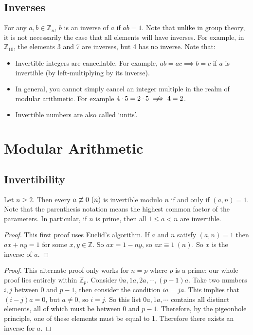 \documentclass{article}
\begin{document}
\subsection{Inverses}
For any $a, b \in \mathbb Z_n$, $b$ is an inverse of $a$ if $ab=1$. Note that unlike in group theory, it is not necessarily the case that all elements will have inverses. For example, in $\mathbb Z_{10}$, the elements 3 and 7 are inverses, but 4 has no inverse. Note that:
\begin{itemize}
	\item Invertible integers are cancellable. For example, $ab=ac \implies b=c$ if $a$ is invertible (by left-multiplying by its inverse).
	\item In general, you cannot simply cancel an integer multiple in the realm of modular arithmetic. For example $4 \cdot 5 = 2 \cdot 5 \centernot\implies 4 = 2$.
	\item Invertible numbers are also called `units'.
\end{itemize}

\section{Modular Arithmetic}
\subsection{Invertibility}
\begin{proposition}
	Let $n \geq 2$. Then every $a \centernot\equiv 0\ (n)$ is invertible modulo $n$ if and only if $(a, n) = 1$. Note that the parenthesis notation means the highest common factor of the parameters. In particular, if $n$ is prime, then all $1 \leq a < n$ are invertible.
\end{proposition}
\begin{proof}
	This first proof uses Euclid's algorithm. If $a$ and $n$ satisfy $(a, n) = 1$ then $ax + ny = 1$ for some $x, y \in \mathbb Z$. So $ax = 1 - ny$, so $ax \equiv 1\ (n)$. So $x$ is the inverse of $a$.
\end{proof}
\begin{proof}
	This alternate proof only works for $n=p$ where $p$ is a prime; our whole proof lies entirely within $\mathbb Z_p$. Consider $0a, 1a, 2a, \cdots, (p-1)a$. Take two numbers $i, j$ between 0 and $p-1$, then consider the condition $ia = ja$. This implies that $(i - j)a = 0$, but $a \neq 0$, so $i=j$. So this list $0a, 1a, \cdots$ contains all distinct elements, all of which must be between 0 and $p-1$. Therefore, by the pigeonhole principle, one of these elements must be equal to 1. Therefore there exists an inverse for $a$.
\end{proof}
\end{document}
